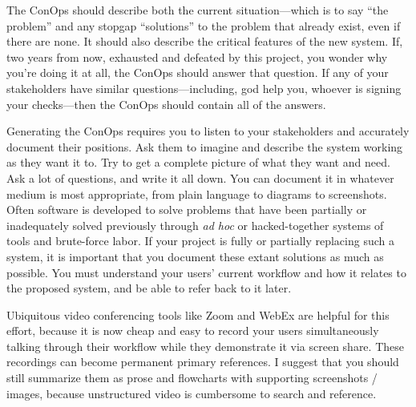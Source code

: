 \documentclass[12pt,oneside]{book}
\begin{document}
The ConOps should describe both the current situation---which is to say ``the problem'' and any stopgap ``solutions'' to the problem that already exist, even if there are none. It should also describe the critical features of the new system. If, two years from now, exhausted and defeated by this project, you wonder why you're doing it at all, the ConOps should answer that question. If any of your stakeholders have similar questions---including, god help you, whoever is signing your checks---then the ConOps should contain all of the answers.

Generating the ConOps requires you to listen to your stakeholders and accurately document their positions. Ask them to imagine and describe the system working as they want it to. Try to get a complete picture of what they want and need. Ask a lot of questions, and write it all down. You can document it in whatever medium is most appropriate, from plain language to diagrams to screenshots. Often software is developed to solve problems that have been partially or inadequately solved previously through \emph{ad hoc} or hacked-together systems of tools and brute-force labor. If your project is fully or partially replacing such a system, it is important that you document these extant solutions as much as possible. You must understand your users' current workflow and how it relates to the proposed system, and be able to refer back to it later.

Ubiquitous video conferencing tools like Zoom and WebEx are helpful for this effort, because it is now cheap and easy to record your users simultaneously talking through their workflow while they demonstrate it via screen share. These recordings can become permanent primary references. I suggest that you should still summarize them as prose and flowcharts with supporting screenshots / images, because unstructured video is cumbersome to search and reference.
\end{document}
